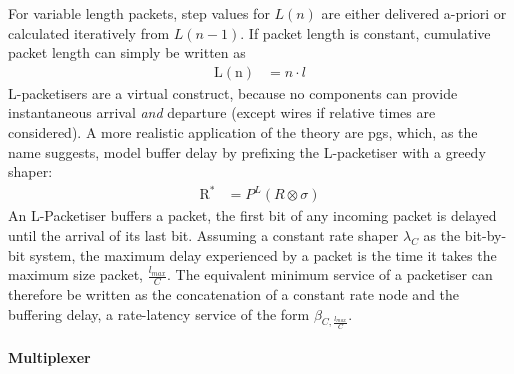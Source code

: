%
For variable length packets, step values for $L(n)$ are either delivered a-priori or calculated
iteratively from $L(n-1)$. If packet length is constant, cumulative packet length can simply be written as
%
\begin{align}
\mathrm{L(n)} &= n\cdot l
\label{eq:l_const}
\end{align}
%
L-packetisers are a virtual construct, because no components can provide instantaneous arrival \emph{and} departure (except wires if relative times are considered).
A more realistic application of the theory are \gls{pgs}, which, as the name suggests,  model buffer
delay by prefixing the L-packetiser with a greedy shaper:
%
\begin{align}
\mathrm{R^*} &= P^L(R \otimes \sigma)
\label{eq:l_framer}
\end{align}
%
An L-Packetiser buffers a packet, the first bit of any incoming packet is delayed until the arrival of its last bit.
Assuming a constant rate shaper $\lambda_C$ as the bit-by-bit system, the maximum delay experienced by a packet is the time it takes
the maximum size packet, $\frac{l_{max}}{C}$. The equivalent minimum service of a packetiser can therefore be written as the concatenation of
a constant rate node and the buffering delay, a rate-latency service of the form $\beta_{C,\frac{l_{max}}{C}}$.

\paragraph{Multiplexer}

